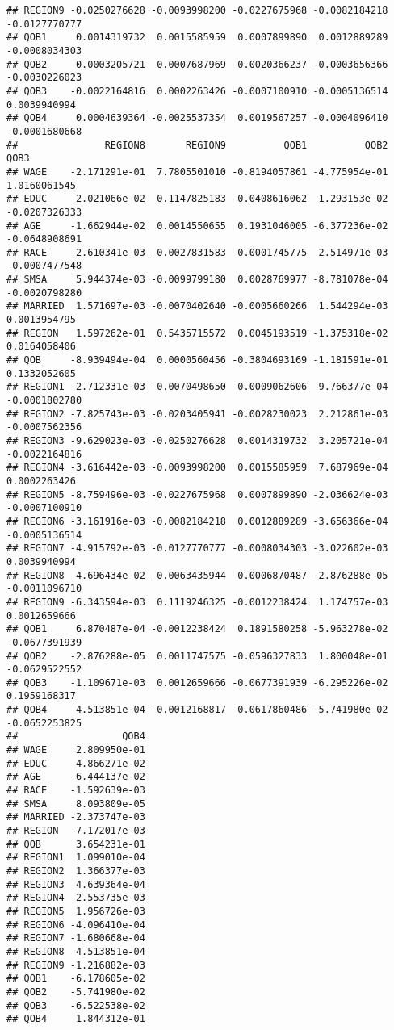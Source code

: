 \documentclass[
]{article}
\begin{document}
\begin{verbatim}
## REGION9 -0.0250276628 -0.0093998200 -0.0227675968 -0.0082184218 -0.0127770777
## QOB1     0.0014319732  0.0015585959  0.0007899890  0.0012889289 -0.0008034303
## QOB2     0.0003205721  0.0007687969 -0.0020366237 -0.0003656366 -0.0030226023
## QOB3    -0.0022164816  0.0002263426 -0.0007100910 -0.0005136514  0.0039940994
## QOB4     0.0004639364 -0.0025537354  0.0019567257 -0.0004096410 -0.0001680668
##               REGION8       REGION9          QOB1          QOB2          QOB3
## WAGE    -2.171291e-01  7.7805501010 -0.8194057861 -4.775954e-01  1.0160061545
## EDUC     2.021066e-02  0.1147825183 -0.0408616062  1.293153e-02 -0.0207326333
## AGE     -1.662944e-02  0.0014550655  0.1931046005 -6.377236e-02 -0.0648908691
## RACE    -2.610341e-03 -0.0027831583 -0.0001745775  2.514971e-03 -0.0007477548
## SMSA     5.944374e-03 -0.0099799180  0.0028769977 -8.781078e-04 -0.0020798280
## MARRIED  1.571697e-03 -0.0070402640 -0.0005660266  1.544294e-03  0.0013954795
## REGION   1.597262e-01  0.5435715572  0.0045193519 -1.375318e-02  0.0164058406
## QOB     -8.939494e-04  0.0000560456 -0.3804693169 -1.181591e-01  0.1332052605
## REGION1 -2.712331e-03 -0.0070498650 -0.0009062606  9.766377e-04 -0.0001802780
## REGION2 -7.825743e-03 -0.0203405941 -0.0028230023  2.212861e-03 -0.0007562356
## REGION3 -9.629023e-03 -0.0250276628  0.0014319732  3.205721e-04 -0.0022164816
## REGION4 -3.616442e-03 -0.0093998200  0.0015585959  7.687969e-04  0.0002263426
## REGION5 -8.759496e-03 -0.0227675968  0.0007899890 -2.036624e-03 -0.0007100910
## REGION6 -3.161916e-03 -0.0082184218  0.0012889289 -3.656366e-04 -0.0005136514
## REGION7 -4.915792e-03 -0.0127770777 -0.0008034303 -3.022602e-03  0.0039940994
## REGION8  4.696434e-02 -0.0063435944  0.0006870487 -2.876288e-05 -0.0011096710
## REGION9 -6.343594e-03  0.1119246325 -0.0012238424  1.174757e-03  0.0012659666
## QOB1     6.870487e-04 -0.0012238424  0.1891580258 -5.963278e-02 -0.0677391939
## QOB2    -2.876288e-05  0.0011747575 -0.0596327833  1.800048e-01 -0.0629522552
## QOB3    -1.109671e-03  0.0012659666 -0.0677391939 -6.295226e-02  0.1959168317
## QOB4     4.513851e-04 -0.0012168817 -0.0617860486 -5.741980e-02 -0.0652253825
##                  QOB4
## WAGE     2.809950e-01
## EDUC     4.866271e-02
## AGE     -6.444137e-02
## RACE    -1.592639e-03
## SMSA     8.093809e-05
## MARRIED -2.373747e-03
## REGION  -7.172017e-03
## QOB      3.654231e-01
## REGION1  1.099010e-04
## REGION2  1.366377e-03
## REGION3  4.639364e-04
## REGION4 -2.553735e-03
## REGION5  1.956726e-03
## REGION6 -4.096410e-04
## REGION7 -1.680668e-04
## REGION8  4.513851e-04
## REGION9 -1.216882e-03
## QOB1    -6.178605e-02
## QOB2    -5.741980e-02
## QOB3    -6.522538e-02
## QOB4     1.844312e-01
\end{verbatim}
\end{document}
